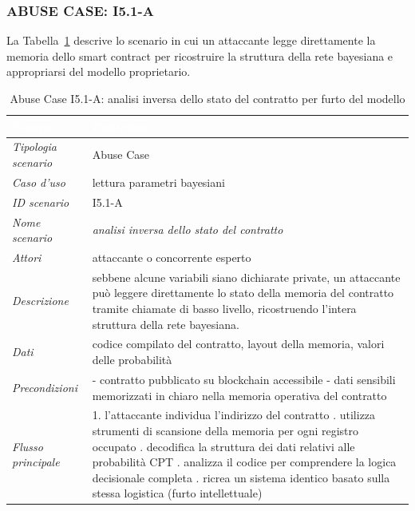 \subsubsection*{ABUSE CASE: I5.1-A}
La Tabella~\ref{tab:i51a} descrive lo scenario in cui un attaccante legge direttamente la memoria dello smart contract per ricostruire la struttura della rete bayesiana e appropriarsi del modello proprietario.
\begin{longtable}{| >{\columncolor{abuseCol}}p{} | p{} |}
\caption{Abuse Case I5.1-A: analisi inversa dello stato del contratto per furto del modello}\label{tab:i51a}\\
\hline
\rowcolor{abuseHeader} \textcolor{white}{\textit{Campo}} & \textcolor{white}{\textit{Contenuto}} \\
\hline
\textit{Tipologia scenario} & Abuse Case \\
\hline
\textit{Caso d'uso} & lettura parametri bayesiani \\
\hline
\textit{ID scenario} & I5.1-A \\
\hline
\textit{Nome scenario} & \textit{analisi inversa dello stato del contratto} \\
\hline
\textit{Attori} & attaccante o concorrente esperto \\
\hline
\textit{Descrizione} & sebbene alcune variabili siano dichiarate private, un attaccante può leggere direttamente lo stato della memoria del contratto tramite chiamate di basso livello, ricostruendo l'intera struttura della rete bayesiana. \\
\hline
\textit{Dati} & codice compilato del contratto, layout della memoria, valori delle probabilità \\
\hline
\textit{Precondizioni} & - contratto pubblicato su blockchain accessibile \newline - dati sensibili memorizzati in chiaro nella memoria operativa del contratto \\
\hline
\textit{Flusso principale} & 1. l'attaccante individua l'indirizzo del contratto \newline 2. utilizza strumenti di scansione della memoria per ogni registro occupato \newline 3. decodifica la struttura dei dati relativi alle probabilità CPT \newline 4. analizza il codice per comprendere la logica decisionale completa \newline 5. ricrea un sistema identico basato sulla stessa logistica (furto intellettuale) \\

\end{longtable}
